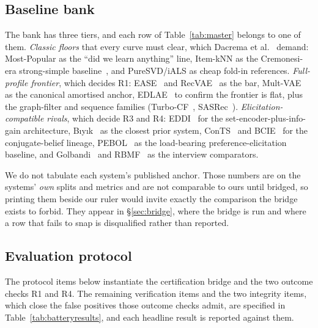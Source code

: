 \documentclass[11pt]{article}
\begin{document}
\subsection{Baseline bank}
The bank has three tiers, and each row of Table~\ref{tab:master} belongs to one of them. \emph{Classic floors}
that every curve must clear, which Dacrema et al.~\cite{dacrema2019progress} demand: Most-Popular as the
``did we learn anything'' line, Item-kNN as the Cremonesi-era strong-simple
baseline~\cite{cremonesi2010performance}, and PureSVD/iALS as cheap fold-in references. \emph{Full-profile
frontier}, which decides R1: EASE~\cite{steck2019ease} and RecVAE~\cite{ren2020recvae} as the bar,
Mult-VAE~\cite{liang2018variational} as the canonical amortised anchor, EDLAE~\cite{steck2020edlae} to
confirm the frontier is flat, plus the graph-filter and sequence families
(Turbo-CF~\cite{park2024turbocf}, SASRec~\cite{kang2018sasrec}). \emph{Elicitation-compatible rivals}, which
decide R3 and R4: EDDI~\cite{ma2019eddi} for the set-encoder-plus-info-gain architecture,
B\i y\i k~\cite{biyik2023soft} as the closest prior system, ConTS~\cite{li2021seamlessly} and
BCIE~\cite{toroghi2023bcie} for the conjugate-belief lineage, PEBOL~\cite{austin2024bayesian} as the
load-bearing preference-elicitation baseline, and Golbandi~\cite{golbandi2011adaptive} and
RBMF~\cite{liu2011wisdom,zhou2011functional} as the interview comparators.

We do not tabulate each system's published anchor. Those numbers are on the systems' \emph{own} splits and
metrics and are not comparable to ours until bridged, so printing them beside our ruler would invite exactly
the comparison the bridge exists to forbid. They appear in \S\ref{sec:bridge}, where the bridge is run and
where a row that fails to snap is disqualified rather than reported.

\subsection{Evaluation protocol}
The protocol items below instantiate the certification bridge and the two outcome checks R1 and R4. The remaining
verification items and the two integrity items, which close the false positives those outcome checks admit, are
specified in Table~\ref{tab:batteryresults}, and each headline result is reported against them.
\end{document}
